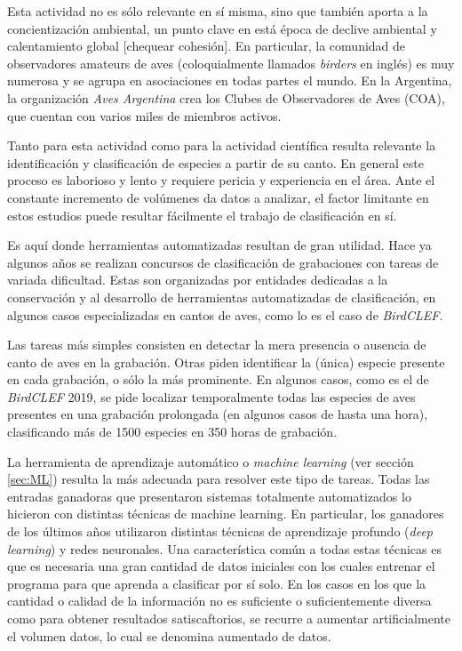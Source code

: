 \documentclass[12pt,twoside,a4paper]{article}
\begin{document}
Esta actividad no es sólo relevante en sí misma, sino que también aporta a la concientización ambiental, un punto clave en está época de declive ambiental y calentamiento global [chequear cohesión]\autocite{Johnston}. En particular, la comunidad de observadores amateurs de aves (coloquialmente llamados \textit{birders} en inglés) es muy numerosa y se agrupa en asociaciones en todas partes el mundo. En la Argentina, la organización \textit{Aves Argentina} crea los Clubes de Observadores de Aves (COA), que cuentan con varios miles de miembros activos\autocite{OAA}.

Tanto para esta actividad como para la actividad científica resulta relevante la identificación y clasificación de especies a partir de su canto. En general este proceso es laborioso y lento y requiere pericia y experiencia en el área. Ante el constante incremento de volúmenes da datos a analizar, el factor limitante en estos estudios puede resultar fácilmente el trabajo de clasificación en sí.

Es aquí donde herramientas automatizadas resultan de gran utilidad. Hace ya algunos años se realizan concursos de clasificación de grabaciones con tareas de variada dificultad\autocite{DCASE, Kaggle, NIPS4B, BirdCLEF, MLL}. Estas son organizadas por entidades dedicadas a la conservación y al desarrollo de herramientas automatizadas de clasificación, en algunos casos especializadas en cantos de aves, como lo es el caso de \textit{BirdCLEF}.

Las tareas más simples consisten en detectar la mera presencia o ausencia de canto de aves en la grabación. Otras piden identificar la (única) especie presente en cada grabación, o sólo la más prominente. En algunos casos, como es el de \textit{BirdCLEF} 2019, se pide localizar temporalmente todas las especies de aves presentes en una grabación prolongada (en algunos casos de hasta una hora), clasificando más de 1500 especies en 350 horas de grabación.

La herramienta de aprendizaje automático o \textit{machine learning} (ver sección \ref{sec:ML}) resulta la más adecuada para resolver este tipo de tareas\autocite{Stowell, Ranjard, Koh}. Todas las entradas ganadoras que presentaron sistemas totalmente automatizados lo hicieron con distintas técnicas de machine learning. En particular, los ganadores de los últimos años utilizaron distintas técnicas de aprendizaje profundo (\textit{deep learning}) y redes neuronales. Una característica común a todas estas técnicas es que es necesaria una gran cantidad de datos iniciales con los cuales entrenar el programa para que aprenda a clasificar por sí solo. En los casos en los que la cantidad o calidad de la información no es suficiente o suficientemente diversa como para obtener resultados satiscaftorios, se recurre a aumentar artificialmente el volumen datos, lo cual se denomina aumentado de datos.
\end{document}
